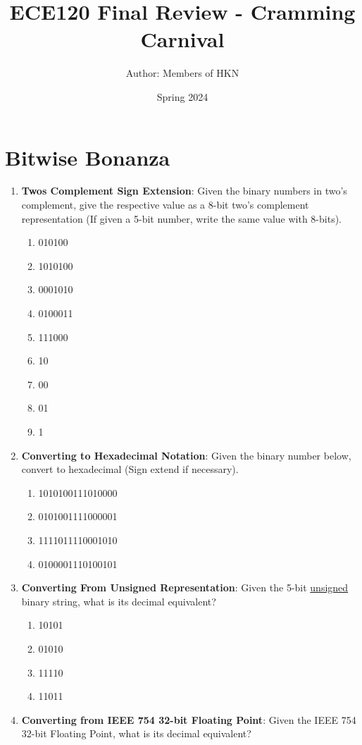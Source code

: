 \documentclass{article}
\title{ECE120 Final Review - Cramming Carnival}
\author{Author: Members of HKN}
\date{Spring 2024}
\begin{document}
\maketitle

\section{Bitwise Bonanza}
\begin{enumerate}[label=(\alph*)]
    \item \textbf{Twos Complement Sign Extension}: Given the binary numbers in two’s complement, give the respective value as a 8-bit two’s complement representation (If given a 5-bit number, write the same value with 8-bits).
    \begin{enumerate}[label=(\roman*)]
        \item 010100
        \item 1010100
        \item 0001010
        \item 0100011
        \item 111000
        \item 10
        \item 00
        \item 01
        \item 1
    \end{enumerate}
    \item \textbf{Converting to Hexadecimal Notation}: Given the binary number below, convert to hexadecimal (Sign extend if necessary).
    \begin{enumerate}[label=(\roman*)]
        \item 1010100111010000
        \item 0101001111000001
        \item 1111011110001010
        \item 0100001110100101
    \end{enumerate}
    \item \textbf{Converting From Unsigned Representation}: Given the 5-bit \underline{unsigned} binary string, what is its decimal equivalent?
    \begin{enumerate}[label=(\roman*)]
        \item 10101
        \item 01010
        \item 11110
        \item 11011
    \end{enumerate}
    \item \textbf{Converting from IEEE 754 32-bit Floating Point}: Given the IEEE 754 32-bit Floating Point, what is its decimal equivalent?

\end{enumerate}
\end{document}
